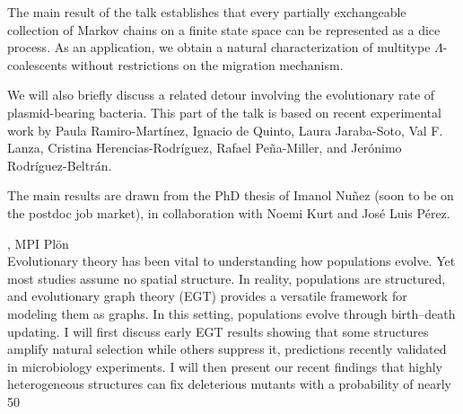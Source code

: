 \documentclass[12pt,a4paper]{article}
\begin{document}
 The main result of the talk establishes that every partially exchangeable collection of Markov chains on a finite state space can be represented as a dice process. As an application, we obtain a natural characterization of multitype $\Lambda$-coalescents without restrictions on the migration mechanism. 

 We will also briefly discuss a related detour involving the evolutionary rate of plasmid-bearing bacteria. This part of the talk is based on recent experimental work by Paula Ramiro-Martínez, Ignacio de Quinto, Laura Jaraba-Soto, Val F. Lanza, Cristina Herencias-Rodríguez, Rafael Peña-Miller, and Jerónimo Rodríguez-Beltrán. 

 The main results are drawn from the PhD thesis of Imanol Nuñez (soon to be on the postdoc job market), in collaboration with Noemi Kurt and José Luis Pérez. 

\bigskip\bigskip

, MPI Plön \\[2ex] Evolutionary theory has been vital to understanding how populations evolve. Yet most studies assume no spatial structure. In reality, populations are structured, and evolutionary graph theory (EGT) provides a versatile framework for modeling them as graphs. In this setting, populations evolve through birth–death updating. I will first discuss early EGT results showing that some structures amplify natural selection while others suppress it, predictions recently validated in microbiology experiments. I will then present our recent findings that highly heterogeneous structures can fix deleterious mutants with a probability of nearly 50%

\bigskip\bigskip
\end{document}
